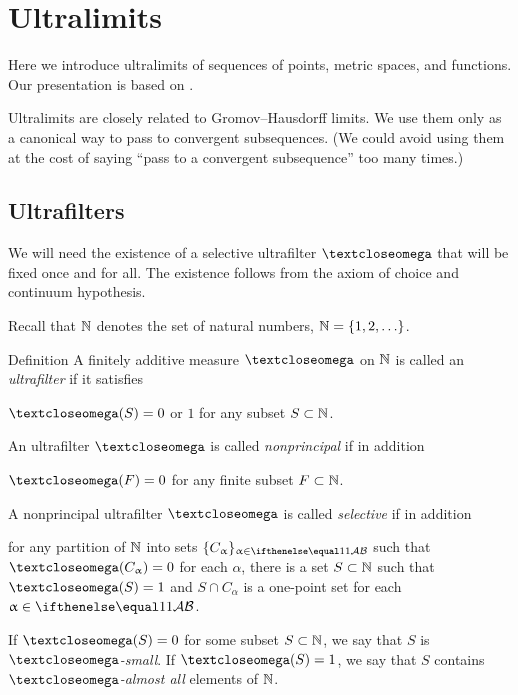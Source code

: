 \chapter{Ultralimits}

Here we introduce ultralimits of sequences of points, metric spaces, and functions.
Our presentation is based on \cite{kleiner-leeb}.

Ultralimits are closely related to Gromov--Hausdorff limits.
We use them only as a canonical way to pass to  convergent subsequences.
(We could avoid using them at the cost of saying ``pass to a convergent subsequence'' too many times.)

\section{Ultrafilters}

We will need the existence of a selective ultrafilter $\o$ that will be fixed once and  for all.
The existence follows from the axiom of choice and continuum hypothesis.

Recall that $\mathbb{N}$ denotes the set of natural numbers, $\NN=\{1,2,\dots\}$.

\begin{thm}{Definition}\label{def:ultrafilter}
A finitely additive measure $\o$ 
on  $\mathbb{N}$ 
is called an \emph{ultrafilter} if it satisfies 
\begin{subthm}{}
$\o(S)=0$ or $1$ for any subset $S\subset \NN$.
\end{subthm}
An ultrafilter $\o$ is called 
\emph{nonprincipal} if in addition 
\begin{subthm}{}
$\o(F)=0$ for any finite subset $F\subset \NN$.
\end{subthm}
A nonprincipal ultrafilter $\o$ is called 
\emph{selective} if in addition 
\begin{subthm}{}
for any partition of $\mathbb{N}$ into sets $\{C_\alpha\}_{\alpha\in\IndexSet}$ such that $\o(C_\alpha)\z=0$ for each $\alpha$, 
there is a set $S\subset \NN$ such that $\o(S)=1$ and $S\cap C_\alpha$ is a one-point set for each $\alpha\in\IndexSet$.
\end{subthm}
\end{thm}

If $\o(S)=0$ for some subset $S\subset \NN$,
we say that $S$ is \emph{$\o$-small}. 
If $\o(S)=1$, we say that $S$ contains \emph{$\o$-almost all} elements of $\mathbb{N}$.

